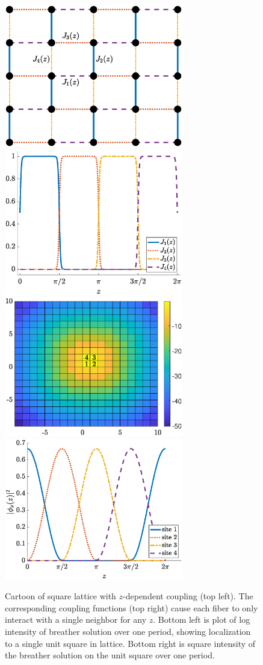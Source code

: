\documentclass[12pt,reqno,oneside,hidelinks]{article}
\begin{document}
\begin{figure}
    \centering
    \includegraphics[width=7.8cm]{images/lattice.eps}
    \includegraphics[width=7.8cm]{images/Jplot.eps}
    \includegraphics[width=7.8cm]{images/fundc1map.eps}
    \includegraphics[width=7.8cm]{images/fundc1sol.eps}
    \caption{Cartoon of square lattice with $z$-dependent coupling (top left). The corresponding coupling functions (top right) cause each fiber to only interact with a single neighbor for any $z$. Bottom left is plot of log intensity of breather solution over one period, showing localization to a single unit square in lattice. Bottom right is square intensity of the breather solution on the unit square over one period.}
    \label{fig:Rechtsman}
\end{figure} 

\pagebreak

\footnotesize{  }
\end{document}

